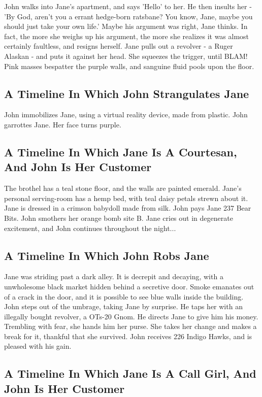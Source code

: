 \documentclass{article}
\begin{document}
John walks into Jane's apartment, and says 'Hello' to her.
He then insults her {-} 'By God, aren't you a errant hedge{-}born ratsbane?
You know, Jane, maybe you should just take your own life.'
Maybe his argument was right, Jane thinks.
In fact, the more she weighs up his argument, the more she realizes it was almost certainly faultless, and resigns herself.
Jane pulls out a revolver {-} a Ruger Alaskan {-} and puts it against her head.
She squeezes the trigger, until BLAM!
Pink masses bespatter the purple walls, and sanguine fluid pools upon the floor.
\subsection{A Timeline In Which John Strangulates Jane}


John immobilizes Jane, using a virtual reality device, made from plastic.
John garrottes Jane.
Her face turns purple.
\subsection{A Timeline In Which Jane Is A Courtesan, And John Is Her Customer}


The brothel has a teal stone floor, and the walls are painted emerald.
Jane's personal serving{-}room has a hemp bed, with teal daisy petals strewn about it.
Jane is dressed in a crimson babydoll made from silk.
John pays Jane 237 Bear Bits.
John smothers her orange bomb site B.
Jane cries out in degenerate excitement, and John continues throughout the night...
\subsection{A Timeline In Which John Robs Jane}


Jane was striding past a dark alley.
It is decrepit and decaying, with a unwholesome black market hidden behind a secretive door.
Smoke emanates out of a crack in the door, and it is possible to see blue walls inside the building.
John steps out of the umbrage, taking Jane by surprise.
He taps her with an illegally bought revolver, a OTs{-}20 Gnom.
He directs Jane to give him his money.
Trembling with fear, she hands him her purse.
She takes her change and makes a break for it, thankful that she survived.
John receives 226 Indigo Hawks, and is pleased with his gain.
\subsection{A Timeline In Which Jane Is A Call Girl, And John Is Her Customer}
\end{document}
